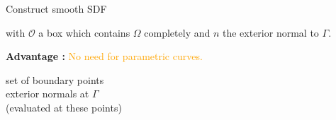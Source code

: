 \begin{frame}[allowframebreaks]{Construct smooth SDF}
\begin{tcolorbox}
			with $\mathcal{O}$ a box which contains $\Omega$ completely and $n$ the exterior normal to $\Gamma$.
		\end{tcolorbox}
		
		\textbf{Advantage :} \textcolor{orange}{No need for parametric curves.}
		
		\begin{minipage}{0.48\linewidth}
			\centering
		\end{minipage} 
		\begin{minipage}{0.48\linewidth}
			 set of boundary points \\
			 exterior normals at $\Gamma$ \\
			(evaluated at these points)
		\end{minipage}
\end{frame}

